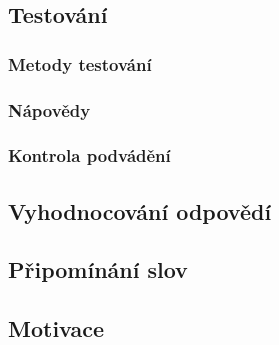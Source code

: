 \documentclass[a4paper,11pt,titlepage,fleqn]{article}
\begin{document}
    \subsection{Testování}

        \subsubsection{Metody testování}
    
        \subsubsection{Nápovědy}

        \subsubsection{Kontrola podvádění}


    \subsection{Vyhodnocování odpovědí}

    \subsection{Připomínání slov}

    \subsection{Motivace}
\end{document}
